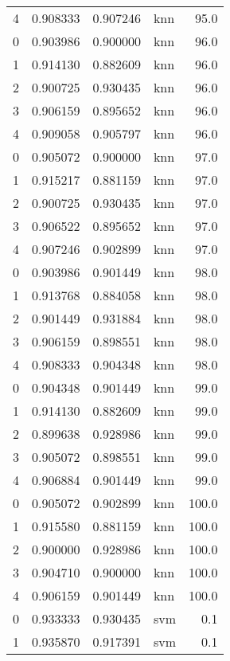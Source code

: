 \begin{tabular}{rrrlr}
     4 & 0.908333 & 0.907246 &      knn &       95.0 \\
     0 & 0.903986 & 0.900000 &      knn &       96.0 \\
     1 & 0.914130 & 0.882609 &      knn &       96.0 \\
     2 & 0.900725 & 0.930435 &      knn &       96.0 \\
     3 & 0.906159 & 0.895652 &      knn &       96.0 \\
     4 & 0.909058 & 0.905797 &      knn &       96.0 \\
     0 & 0.905072 & 0.900000 &      knn &       97.0 \\
     1 & 0.915217 & 0.881159 &      knn &       97.0 \\
     2 & 0.900725 & 0.930435 &      knn &       97.0 \\
     3 & 0.906522 & 0.895652 &      knn &       97.0 \\
     4 & 0.907246 & 0.902899 &      knn &       97.0 \\
     0 & 0.903986 & 0.901449 &      knn &       98.0 \\
     1 & 0.913768 & 0.884058 &      knn &       98.0 \\
     2 & 0.901449 & 0.931884 &      knn &       98.0 \\
     3 & 0.906159 & 0.898551 &      knn &       98.0 \\
     4 & 0.908333 & 0.904348 &      knn &       98.0 \\
     0 & 0.904348 & 0.901449 &      knn &       99.0 \\
     1 & 0.914130 & 0.882609 &      knn &       99.0 \\
     2 & 0.899638 & 0.928986 &      knn &       99.0 \\
     3 & 0.905072 & 0.898551 &      knn &       99.0 \\
     4 & 0.906884 & 0.901449 &      knn &       99.0 \\
     0 & 0.905072 & 0.902899 &      knn &      100.0 \\
     1 & 0.915580 & 0.881159 &      knn &      100.0 \\
     2 & 0.900000 & 0.928986 &      knn &      100.0 \\
     3 & 0.904710 & 0.900000 &      knn &      100.0 \\
     4 & 0.906159 & 0.901449 &      knn &      100.0 \\
     0 & 0.933333 & 0.930435 &      svm &        0.1 \\
     1 & 0.935870 & 0.917391 &      svm &        0.1 \\

\end{tabular}

